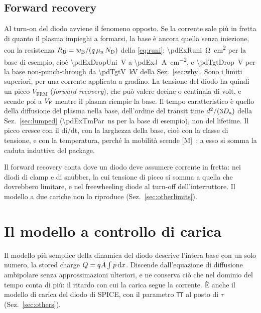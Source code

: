 \documentclass[10pt,a4paper]{scrartcl}
\let\newcommand\pdvaluedefine
\newcommand{\VF}{V_\mathrm{F}}
\newcommand{\diff}{\mathrm{d}}
\newcommand{\ND}{N_\mathrm{D}}
\newcommand{\wB}{w_\mathrm{B}}
\newcommand{\Da}{D_\mathrm{a}}
\newcommand{\mun}{\mu_\mathrm{n}}
\begin{document}
\subsection{Forward recovery}
\label{sec:forwardrec}
Al turn-on del diodo avviene il fenomeno opposto. Se la corrente sale più in fretta di quanto il plasma impieghi a formarsi, la base è ancora quella senza iniezione, con la resistenza $R_\mathrm{B} = \wB/(q\,\mun\,\ND)$ della \eqref{eq:runi}: \SI{\pdExRuni}{\ohm\centi\metre\squared} per la base di esempio, cioè \SI{\pdExDropUni}{\volt} a \SI{\pdExJ}{\ampere\per\centi\metre\squared}, e \SI{\pdTgtDrop}{\volt} per la base non-punch-through da \SI{\pdTgtV}{\kilo\volt} della Sez.~\ref{sec:why}. Sono i limiti superiori, per una corrente applicata a gradino. La tensione del diodo ha quindi un picco $V_\mathrm{FRM}$ (\emph{forward recovery}), che può valere decine o centinaia di volt, e scende poi a $\VF$ mentre il plasma riempie la base. Il tempo caratteristico è quello della diffusione del plasma nella base, dell'ordine del transit time $d^2/(3\Da)$ della Sez.~\ref{sec:lumped} (\SI{\pdExTmPar}{\nano\second} per la base di esempio), non del lifetime. Il picco cresce con il di/dt, con la larghezza della base, cioè con la classe di tensione, e con la temperatura, perché la mobilità scende [M]~\cite{lutz}; a esso si somma la caduta induttiva del package.

Il forward recovery conta dove un diodo deve assumere corrente in fretta: nei diodi di clamp e di snubber, la cui tensione di picco si somma a quella che dovrebbero limitare, e nel freewheeling diode al turn-off dell'interruttore. Il modello a due cariche non lo riproduce (Sez.~\ref{sec:otherlimits}).
\section{Il modello a controllo di carica}
\label{sec:chargecontrol}
Il modello più semplice della dinamica del diodo descrive l'intera base con un solo numero, la stored charge $Q = qA\int p\,\diff x$. Discende dall'equazione di diffusione ambipolare senza approssimazioni ulteriori, e ne conserva ciò che nel dominio del tempo conta di più: il ritardo con cui la carica segue la corrente. È anche il modello di carica del diodo di SPICE, con il parametro \texttt{TT} al posto di $\tau$ (Sez.~\ref{sec:others}).
\end{document}
